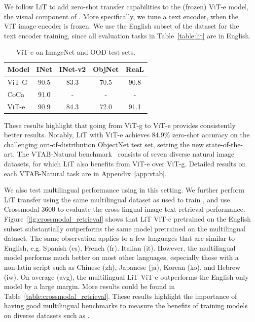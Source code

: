 We follow LiT \citep{lit} to add zero-shot transfer capabilities to the (frozen) ViT-e model, the visual component of \NAME.
More specifically, we tune a text encoder, when the ViT image encoder is frozen.
We use the English subset of the \PTDATA dataset for the text encoder training, since all evaluation tasks in Table~\ref{table:lit} are in English.
\begin{table}[ht!]
\centering
  \begin{tabular}{lcccc}
    \toprule
    Model & INet & INet-v2 & ObjNet  & ReaL \\
    \midrule
     ViT-G & 90.5 & 83.3 & 70.5  & 90.8 \\
     CoCa & 91.0 & - & -  & - \\
     \midrule
     ViT-e & 90.9 & 84.3 & 72.0 & 91.1 \\
    \bottomrule
  \end{tabular}
  \caption{ViT-e on ImageNet and OOD test sets.}
  \label{tbl:vit_e_sup}
\end{table}
These results highlight that going from ViT-g to ViT-e provides consistently better results.
Notably, LiT with ViT-e achieves 84.9\% zero-shot accuracy on the challenging out-of-distribution ObjectNet test set, setting the new state-of-the-art. 
The VTAB-Natural benchmark~\citep{vtab} consists of seven diverse natural image datasets, for which LiT also benefits from ViT-e over ViT-g.
Detailed results on each VTAB-Natural task are in Appendix~\ref{app:vtab}.


We also test multilingual performance using \PTDATA in this setting.
We further perform LiT transfer using the same multilingual \PTDATA dataset as used to train \NAME, and use Crossmodal-3600 to evaluate the cross-lingual image-text retrieval performance. 
Figure~\ref{fig:crossmodal_retrieval} shows that LiT ViT-e pretrained on the English subset substantially outperforms the same model pretrained on the multilingual dataset.
The same observation applies to a few languages that are similar to English, e.g. Spanish (es), French (fr), Italian (it).
However, the multilingual model performs much better on most other languages, especially those with a non-latin script such as Chinese (zh), Japanese (ja), Korean (ko), and Hebrew (iw).
On average (avg), the multilingual LiT ViT-e outperforms the English-only model by a large margin. More results could be found in Table~\ref{table:crossmodal_retrieval}.
These results highlight the importance of having good multilingual benchmarks to measure the benefits of training models on diverse datasets such as \PTDATA.

